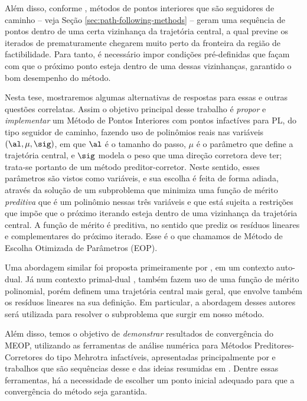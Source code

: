 Além disso, conforme \textcite{Hung:1996br}, métodos de pontos interiores que são seguidores de caminho  -- veja Seção \ref{sec:path-following-methods} --  geram uma sequência de pontos dentro de uma certa vizinhança da  trajetória central, a qual previne os iterados de prematuramente chegarem muito perto da fronteira da região de factibilidade. Para tanto, é necessário impor condições pré-definidas que façam com que o próximo ponto esteja dentro de uma dessas vizinhanças, garantido  o bom desempenho do método. 




Nesta tese, mostraremos algumas alternativas de respostas para  essas e outras questões correlatas. Assim o objetivo principal desse trabalho é \emph{propor} e \emph{implementar} um Método de Pontos Interiores com pontos infactíves para \ac{PL}, do tipo seguidor de caminho, fazendo  uso de polinômios reais nas variáveis $(\al,\mu,\sig)$, em que $\al$ é o tamanho do passo, $\mu$ é o parâmetro que define a trajetória central, e $\sig$ modela o peso que uma direção corretora deve ter; trata-se portanto de um método preditor-corretor. Neste sentido, esses parâmetros são vistos como variáveis, e sua escolha é feita de forma adiada, através da solução de um subproblema que minimiza uma função de mérito \emph{preditiva} que é um polinômio nessas três variáveis e que está sujeita a restrições que impõe que o próximo iterando esteja dentro de uma vizinhança da trajetória central. A função de mérito é preditiva, no sentido que prediz os resíduos lineares e complementares do próximo iterado. Esse é  o que chamamos de Método de Escolha Otimizada de Parâmetros (EOP).


Uma abordagem similar foi proposta primeiramente por \textcite{VillasBoas:2003tg}, em um contexto auto-dual. Já num contexto primal-dual \textcite{VillasBoas:2012ur,VillasBoas2013:wn}, também fazem uso de uma função de mérito polinomial, porém definem uma trajetória central mais geral, que envolve também os resíduos lineares na sua definição.  Em particular, a abordagem desses autores será utilizada para resolver o subproblema que surgir em nosso método.

Além disso, temos o objetivo de \emph{demonstrar} resultados de convergência do MEOP, utilizando as ferramentas de análise numérica para Métodos Preditores-Corretores do tipo Mehrotra infactíveis, apresentadas principalmente por \textcite{Zhang:2006ic} e trabalhos que são sequências desse e das ideias resumidas em \textcite[cap. 7]{Wright:Primal-dual-interior-point:1997h}. Dentre essas ferramentas, há a necessidade de escolher um ponto inicial adequado para que a convergência do método seja garantida.  

